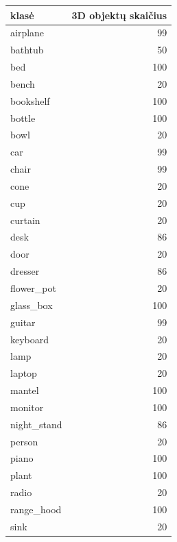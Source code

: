 \begin{table}[]
\begin{tabular}{lr}
	klasė       &   3D objektų skaičius \\
	\hline
	airplane    &                    99 \\
	bathtub     &                    50 \\
	bed         &                   100 \\
	bench       &                    20 \\
	bookshelf   &                   100 \\
	bottle      &                   100 \\
	bowl        &                    20 \\
	car         &                    99 \\
	chair       &                    99 \\
	cone        &                    20 \\
	cup         &                    20 \\
	curtain     &                    20 \\
	desk        &                    86 \\
	door        &                    20 \\
	dresser     &                    86 \\
	flower\_pot  &                    20 \\
	glass\_box   &                   100 \\
	guitar      &                    99 \\
	keyboard    &                    20 \\
	lamp        &                    20 \\
	laptop      &                    20 \\
	mantel      &                   100 \\
	monitor     &                   100 \\
	night\_stand &                    86 \\
	person      &                    20 \\
	piano       &                   100 \\
	plant       &                   100 \\
	radio       &                    20 \\
	range\_hood  &                   100 \\
	sink        &                    20 \\

\end{tabular}
\end{table}
